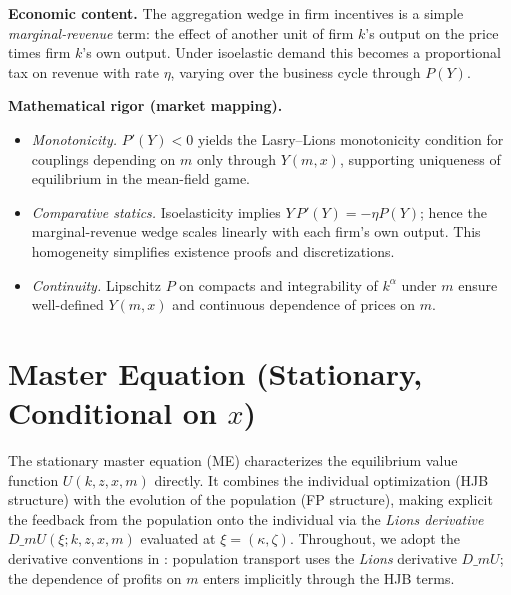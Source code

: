﻿\documentclass[11pt,letterpaper,oneside]{article}
\numberwithin{equation}{section}
\newcommand{\1}{\mathbf{1}}
\newcommand{\dmU}{D\_m U}
\newcommand{\Dm}{D\_m}
\begin{document}
\begin{tcolorbox}[didacticstyle]
\textbf{Economic content.} The aggregation wedge in firm incentives is a simple \emph{marginal-revenue} term: the effect of another unit of firm $k$'s output on the price times firm $k$'s own output. Under isoelastic demand this becomes a proportional tax on revenue with rate $\eta$, varying over the business cycle through $P(Y)$.
\end{tcolorbox}

\begin{tcolorbox}[mathstyle]
\textbf{Mathematical rigor (market mapping).}
\begin{itemize}[leftmargin=1.15em,itemsep=0.25em]
  \item \emph{Monotonicity.} $P'(Y)<0$ yields the Lasry--Lions monotonicity condition for couplings depending on $m$ only through $Y(m,x)$, supporting uniqueness of equilibrium in the mean-field game.
  \item \emph{Comparative statics.} Isoelasticity implies $Y\,P'(Y)=-\eta P(Y)$; hence the marginal-revenue wedge scales linearly with each firm's own output. This homogeneity simplifies existence proofs and discretizations.
  \item \emph{Continuity.} Lipschitz $P$ on compacts and integrability of $k^\alpha$ under $m$ ensure well-defined $Y(m,x)$ and continuous dependence of prices on $m$.
\end{itemize}
\end{tcolorbox}

\section[Master Equation (Stationary, Conditional on x)]{Master Equation (Stationary, Conditional on $x$)}\label{sec:master-equation}
The stationary master equation (ME) characterizes the equilibrium value function $U(k,z,x,m)$ directly. It combines the individual optimization (HJB structure) with the evolution of the population (FP structure), making explicit the feedback from the population onto the individual via the \emph{Lions derivative} $\dmU(\xi;k,z,x,m)$ evaluated at $\xi=(\kappa,\zeta)$. Throughout, we adopt the derivative conventions in : population transport uses the \emph{Lions} derivative $\Dm U$; the dependence of profits on $m$ enters implicitly through the HJB terms.
\end{document}
